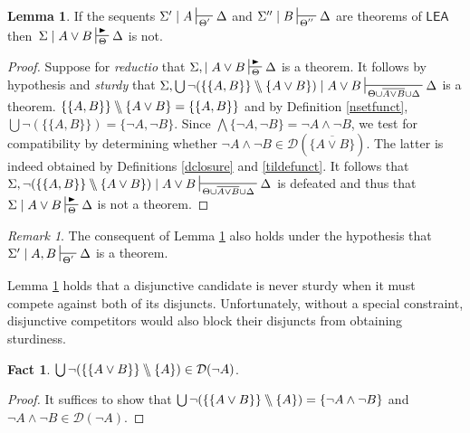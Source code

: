 \documentclass{article}
\theoremstyle{definition}
\theoremstyle{definition}
\theoremstyle{definition}
\newtheorem{lemma}{Lemma}
\theoremstyle{definition}
\theoremstyle{remark}
\newtheorem{remark}{Remark}
\theoremstyle{definition}
\theoremstyle{definition}
\newtheorem{fact}{Fact}
\begin{document}
\begin{lemma}\label{disjmin1}
	If the sequents $ \Sigma' \mid A \sststile{\Theta'}{} \Delta $ and $ \Sigma''\mid B \sststile{\Theta''}{} \Delta $ are theorems of $ \mathsf{LEA}$ then $\, \Sigma \mid A \vee B \sststile{\Theta}{\RHD} \Delta $ is not. 
	
	\begin{proof}
		Suppose for \textit{reductio} that $ \Sigma, \mid A \vee B \sststile{\Theta}{\RHD} \Delta $ is a theorem. It follows by hypothesis and \textit{sturdy} that $ \Sigma, \bigcup\neg(\{\{A, B\}\}\bbslash\{ A\vee B \})\mid A \vee B \sststile{\Theta\cup\overline{A \vee B}\cup\Delta}{} \Delta $ is a theorem. $ \{\{A, B\}\}\bbslash\{ A\vee B \} = \{\{A, B\}\} $ and by Definition \ref{nsetfunct}, $ \bigcup\neg({\{\{A, B\}\}}) = \{\neg A, \neg B \} $. Since $ \bigwedge \{\neg A, \neg B\} = \neg A \wedge \neg B $, we test for compatibility by determining whether $ \neg A \wedge \neg B \in \mathcal{D}(\overline{\{A \vee B \}})$. The latter is indeed obtained by Definitions \ref{dclosure} and \ref{tildefunct}. It follows that $ \Sigma, \neg(\{\{A, B\}\}\bbslash\{ A\vee B \})\mid A \vee B \sststile{\Theta\cup\overline{A \vee B}\cup\Delta}{} \Delta $ is defeated and thus that $ \Sigma\mid A \vee B \sststile{\Theta}{\RHD} \Delta $ is not a theorem.
	\end{proof}
\end{lemma}

\begin{remark}
	The consequent of Lemma \ref{disjmin1} also holds under the hypothesis that $ \Sigma' \mid A, B \sststile{\Theta'}{} \Delta $ is a theorem.
\end{remark}

Lemma \ref{disjmin1} holds that a disjunctive candidate is never sturdy when it must compete against both of its disjuncts. Unfortunately, without a special constraint, disjunctive competitors would also block their disjuncts from obtaining sturdiness. 

\begin{fact}
	$ \bigcup\neg(\{\{A \vee B\}\} \bbslash \{A\}) \in \mathcal{D}(\neg A) $.
	
	\begin{proof}
		It suffices to show that $ \bigcup\neg(\{\{A \vee B\}\} \bbslash \{A\}) = \{\neg A \wedge \neg B\} $ and $ \neg A \wedge \neg B \in \mathcal{D}(\neg A).$
	\end{proof}
	
\end{fact}
\end{document}
